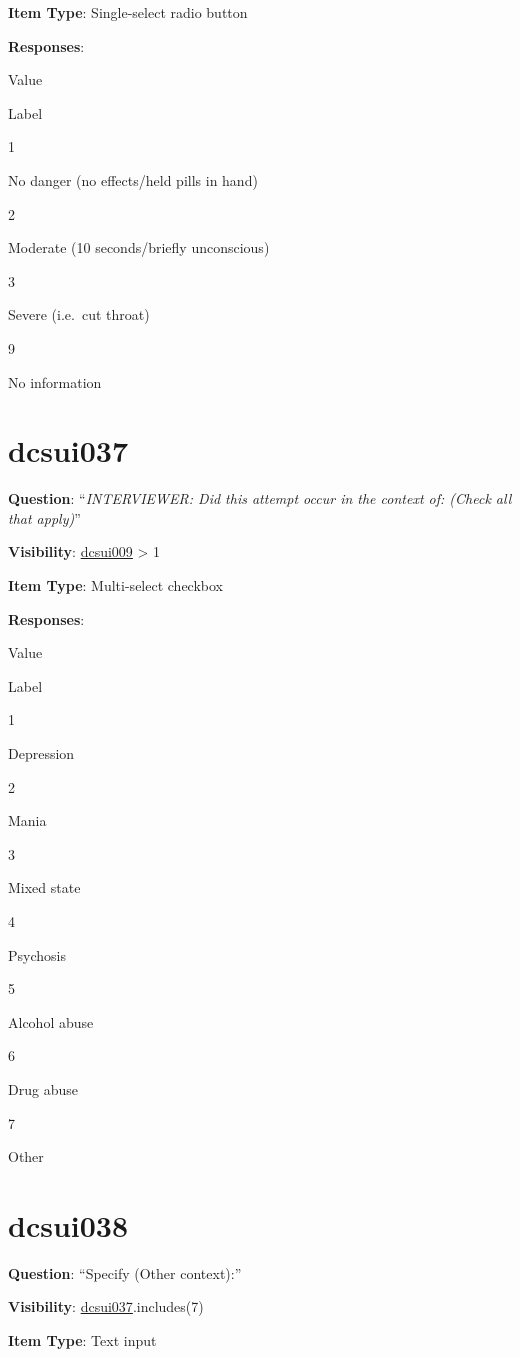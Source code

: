 \documentclass[]{book}
\begin{document}
\textbf{Item Type}: Single-select radio button

\textbf{Responses}:

Value

Label

1

No danger (no effects/held pills in hand)

2

Moderate (10 seconds/briefly unconscious)

3

Severe (i.e.~cut throat)

9

No information

\hypertarget{dcsui037}{%
\section{dcsui037}\label{dcsui037}}

\textbf{Question}: ``\emph{INTERVIEWER: Did this attempt occur in the context of: (Check all that apply)}''

\textbf{Visibility}: \protect\hyperlink{dcsui009}{dcsui009} \textgreater{} 1

\textbf{Item Type}: Multi-select checkbox

\textbf{Responses}:

Value

Label

1

Depression

2

Mania

3

Mixed state

4

Psychosis

5

Alcohol abuse

6

Drug abuse

7

Other

\hypertarget{dcsui038}{%
\section{dcsui038}\label{dcsui038}}

\textbf{Question}: ``Specify (Other context):''

\textbf{Visibility}: \protect\hyperlink{dcsui037}{dcsui037}.includes(7)

\textbf{Item Type}: Text input
\end{document}

